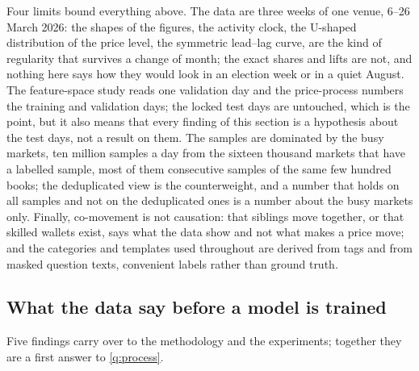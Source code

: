 Four limits bound everything above.  The data are three weeks of one venue, 6--26 March
2026: the shapes of the figures, the activity clock, the U-shaped distribution of the
price level, the symmetric lead--lag curve, are the kind of regularity that survives a
change of month; the exact shares and lifts are not, and nothing here says how they would
look in an election week or in a quiet August.  The feature-space study reads one
validation day and the price-process numbers the training and validation days; the locked
test days are untouched, which is the point, but it also means that every finding of this
section is a hypothesis about the test days, not a result on them.  The samples are
dominated by the busy markets, ten million samples a day from the sixteen thousand markets
that have a labelled sample,
most of them consecutive samples of the same few hundred books; the deduplicated view is
the counterweight, and a number that holds on all samples and not on the deduplicated ones
is a number about the busy markets only.  Finally, co-movement is not causation: that
siblings move together, or that skilled wallets exist, says what the data show and not
what makes a price move; and the categories and templates used throughout are derived
from tags and from masked question texts, convenient labels rather than ground truth.

\subsection{What the data say before a model is trained}
\label{sec:structure:agenda}
\label{sec:expl:agenda}

Five findings carry over to the methodology and the experiments; together they are a
first answer to \ref{q:process}.

